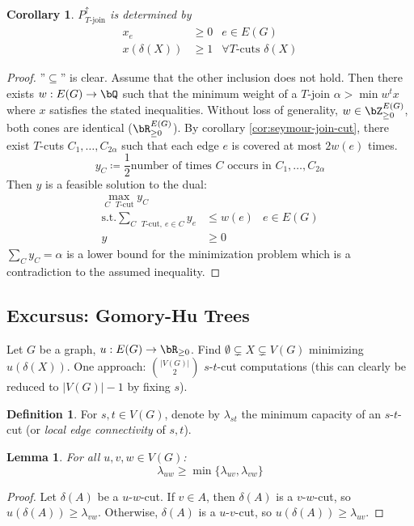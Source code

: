 \documentclass[11pt, a4paper]{article}
\newcommand{\abs}[1]{\left\lvert#1\right\rvert}
\newcommand{\set}[1]{\{#1\}}
\newtheorem{lemma}[theorem]{Lemma}
\newtheorem{cor}[theorem]{Corollary}
\theoremstyle{remark}
\theoremstyle{definition}
\newtheorem{definition}[theorem]{Definition}
\begin{document}
\begin{cor}
	$P^\uparrow_{T\text{-join}}$ is determined by
	\begin{align*}
		x_e          & \geq0  & e\in E(G)                        \\
		x(\delta(X)) & \geq 1 & \forall T\text{-cuts } \delta(X)
	\end{align*}
\end{cor}
\begin{proof}
	''$\subseteq$'' is clear. Assume that the other inclusion does not hold.
	Then there exists $w: E(G)\to\bQ$ such that the minimum weight of a $T$-join
	$\alpha>\min w^tx$ where $x$ satisfies the stated inequalities. Without
	loss of generality, $w\in \bZ^{E(G)}_{\geq0}$, both cones are identical
	($\bR^{E(G)}_{\geq0}$). By corollary \ref{cor:seymour-join-cut}, there
	exist $T$-cuts $C_1,\ldots,C_{2\alpha}$ such that each edge $e$ is covered
	at most $2w(e)$ times.
	\[y_C\coloneqq \frac{1}{2}\text{number of times $C$ occurs in } C_1,\ldots,C_{2\alpha}\]
	Then $y$ is a feasible solution to the dual:
	\begin{align*}
		\max_{C\text{ $T$-cut}}y_C                                              \\
		\text{s.t.} \sum_{C\text{ $T$-cut},\ e\in C}y_e & \leq w(e) & e\in E(G) \\
		y                                               & \geq0
	\end{align*}
	$\sum_{C}y_C=\alpha$ is a lower bound for the minimization problem which
	is a contradiction to the assumed inequality.
\end{proof}

\subsection{Excursus: Gomory-Hu Trees}
Let $G$ be a graph, $u: E(G)\to\bR_{\geq0}$. Find
$\emptyset\subsetneq X \subsetneq V(G)$ minimizing $u(\delta(X))$.
One approach: ${\abs{V(G)}\choose 2}$ $s$-$t$-cut computations (this
can clearly be reduced to $\abs{V(G)}-1$ by fixing $s$).

\begin{definition}
	For $s,t\in V(G)$, denote by $\lambda_{st}$ the minimum capacity of an
	$s$-$t$-cut (or \emph{local edge connectivity} of $s,t$).
\end{definition}

\begin{lemma}
	For all $u,v,w\in V(G)$:
	\[\lambda_{uw}\geq \min\set{\lambda_{uv},\lambda_{vw}}\]
\end{lemma}
\begin{proof}
	Let $\delta(A)$ be a $u$-$w$-cut. If $v\in A$, then $\delta(A)$ is
	a $v$-$w$-cut, so $u(\delta(A))\geq \lambda_{vw}$. Otherwise,
	$\delta(A)$ is a $u$-$v$-cut, so $u(\delta(A))\geq \lambda_{uv}$.
\end{proof}
\end{document}
